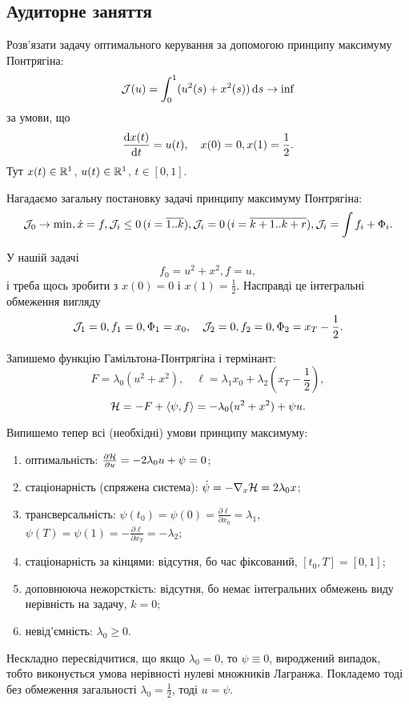 \subsection{Аудиторне заняття}

\begin{problem}
	Розв'язати задачу оптимального керування за допомогою принципу максимуму Понтрягіна: \[ \mathcal{J} (u) = \int_0^1 (u^2 (s) + x^2 (s)) \mathop{}\!\mathrm{d} s \to \inf \] за умови, що \[ \frac{\mathop{}\!\mathrm{d} x(t)}{\mathop{}\!\mathrm{d} t} = u (t), \quad x(0) = 0, x(1) = \frac12. \] Тут $x (t) \in \mathbb{R}^1$, $u (t) \in \mathbb{R}^1$, $t \in [0, 1]$.
\end{problem}

\begin{solution}
	Нагадаємо загальну постановку задачі принципу максимуму Понтрягіна: \[ \mathcal{J}_0 \to \min, \dot x = f, \mathcal{J}_i \le 0 \, (i = \overline{1..k}), \mathcal{J}_i = 0 \, (i = \overline{k+1..k+r}), \mathcal{J}_i = \int f_i + \Phi_i. \]

	У нашій задачі \[ f_0 = u^2 + x^2, f = u, \] і треба щось зробити з $x(0) = 0$ і $x(1) = \frac 12$. Насправді це інтегральні обмеження вигляду \[ \mathcal{J}_1 = 0, f_1 = 0, \Phi_1 = x_0, \quad \mathcal{J}_2 = 0, f_2 = 0, \Phi_2 = x_T - \frac{1}{2}. \]

	Запишемо функцію Гамільтона-Понтрягіна і термінант: \[ F = \lambda_0 (u^2 + x^2), \quad \ell = \lambda_1 x_0 + \lambda_2 \left(x_T - \frac{1}{2}\right), \] \[ \mathcal{H} = -F + \langle \psi, f \rangle = - \lambda_0 (u^2 + x^2) + \psi u. \]

	Випишемо тепер всі (необхідні) умови принципу максимуму:
	\begin{enumerate}
		\item оптимальність: $\frac{\partial \mathcal{H}}{\partial u} = - 2 \lambda_0 u + \psi  = 0$;
		\item стаціонарність (спряжена система): $\dot \psi = - \nabla_x \mathcal{H} = 2 \lambda_0 x$;
		\item трансверсальність: $\psi(t_0) = \psi(0) = \frac{\partial \ell}{\partial x_0} = \lambda_1$, $\psi(T) = \psi(1) = - \frac{\partial \ell}{\partial x_T} = - \lambda_2$;
		\item стаціонарність за кінцями: відсутня, бо час фіксований, $[t_0,T]=[0,1]$;
		\item доповнююча нежорсткість: відсутня, бо немає інтегральних обмежень виду нерівність на задачу, $k = 0$;
		\item невід'ємність: $\lambda_0 \ge 0$.
	\end{enumerate}

	Нескладно пересвідчитися, що якщо $\lambda_0 = 0$, то $\psi \equiv 0$, вироджений випадок, тобто виконується умова нерівності нулеві множників Лагранжа. Покладемо тоді без обмеження загальності $\lambda_0 = \frac{1}{2}$, тоді $u = \psi$. \\


\end{solution}
